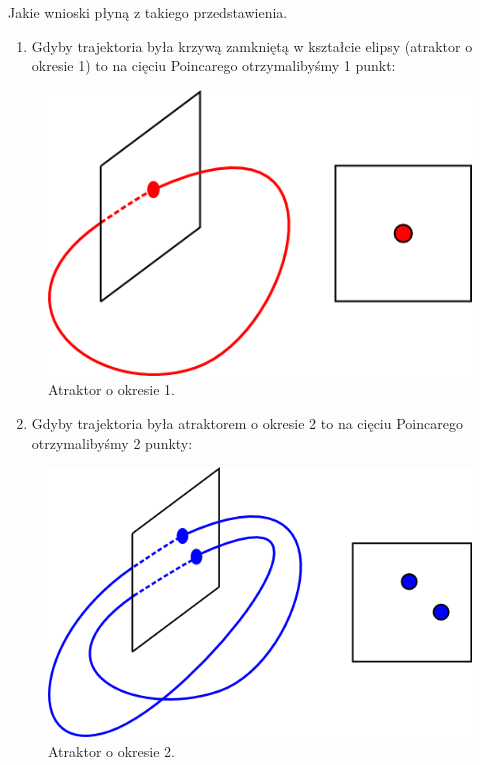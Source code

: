 \documentclass[a4paper,12pt,polish]{sphinxmanual}
\begin{document}
Jakie wnioski płyną z takiego przedstawienia.
\begin{enumerate}
\item {} 
Gdyby trajektoria była krzywą zamkniętą w kształcie elipsy (atraktor o okresie 1) to na cięciu Poincarego otrzymalibyśmy 1 punkt:

\end{enumerate}
\begin{figure}[htbp]
\centering
\capstart

\includegraphics{poincare_period1.png}
\caption{Atraktor o okresie 1.}\end{figure}
\begin{enumerate}
\setcounter{enumi}{1}
\item {} 
Gdyby trajektoria była atraktorem  o okresie 2  to na cięciu Poincarego otrzymalibyśmy 2 punkty:

\end{enumerate}
\begin{figure}[htbp]
\centering
\capstart

\includegraphics{poincare_period2.png}
\caption{Atraktor o okresie 2.}\end{figure}
\end{document}

